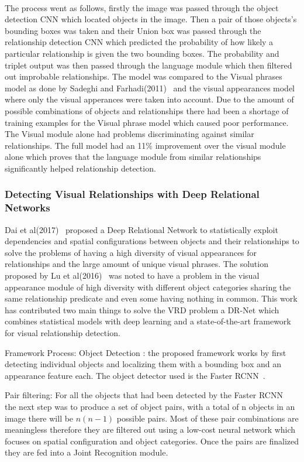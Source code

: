 \documentclass{csfyp}
\newcommand\tab[1][1cm]{\hspace*{#1}}
\begin{document}
\\
\tab
The process went as follows, firstly the image was passed through the object detection CNN which located objects in the image. Then a pair of those objects’s bounding boxes was taken and their Union box was passed through the relationship detection CNN which predicted the probability of how likely a particular relationship is given the two bounding boxes. The probability and triplet output was then passed through the language module which then filtered out improbable relationships. The model was compared to the Visual phrases model as done  by Sadeghi and Farhadi(2011)~\cite{VisualPhrases} and the visual appearances model where only the visual apperances were taken into account. Due to the amount of possible combinations of objects and relationships there had been a shortage of training examples for the Visual phrase model which caused poor performance. The Visual module alone had problems discriminating against similar relationships. The full model had an 11\% improvement over the visual module alone which proves that the language module from similar relationships significantly helped relationship detection. 

\subsubsection{Detecting Visual Relationships with Deep Relational Networks}
Dai et al(2017)~\cite{Dai2017DetectingVR} proposed a Deep Relational Network to statistically exploit dependencies and spatial configurations between objects and their relationships to solve the problems of having a high diversity of visual appearances for relationships and the large amount of unique visual phrases. The solution proposed by Lu et al(2016)~\cite{lu2016visual} was noted to have a problem in the visual appearance module of high diversity with different object categories sharing the same relationship \Gls{predicate} and even some having nothing in common. This work has contributed two main things to solve the VRD problem a DR-Net which combines statistical models with deep learning and a state-of-the-art framework for visual relationship detection. 

Framework Process:
Object Detection : the proposed framework works by first detecting individual objects and localizing them with a bounding box and an appearance feature each. The object detector used is the Faster RCNN~\cite{NIPS2015_5638}.

Pair filtering:
For all the objects that had been detected by the Faster RCNN~\cite{NIPS2015_5638} the next step was to produce a set of object pairs, with a total of n objects in an image there will be $n(n-1)$ possible pairs. Most of these pair combinations are meaningless therefore they are filtered out using a low-cost neural network which focuses on spatial configuration and object categories. Once the pairs are finalized they are fed into a Joint Recognition module.
\end{document}

